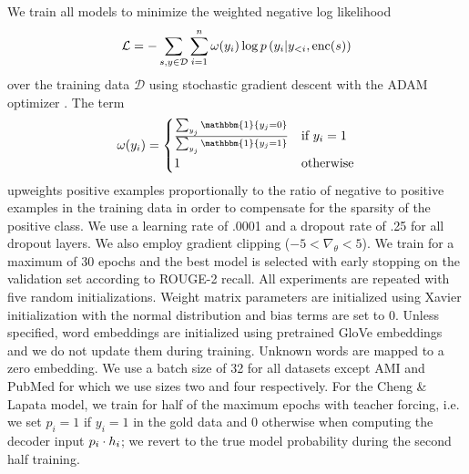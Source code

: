 We train all models to minimize the weighted negative log likelihood
\[\mathcal{L} = -\sum_{s,y\in \mathcal{D}} \sum_{i=1}^\docSize \omega(y_i) \log p\left(y_i|y_{<i},
\operatorname{enc}(\sent)\right)\]
over the training data $\mathcal{D}$
using stochastic gradient descent with the ADAM optimizer
\cite{kingma2014adam}. The term 
\[ \omega(y_i)=\begin{cases}
\frac{\sum_{y_j} \mathbbm{1}\{y_j = 0 \}}{ \sum_{y_j} \mathbbm{1}\{y_j = 1 \}  } & \textrm{if $y_i=1$} \\ 1 & \textrm{otherwise}  \end{cases} \] 
        upweights
    positive examples proportionally to the ratio of negative to positive
    examples in the training data in order to compensate for the sparsity
    of the positive class.
    We use a learning rate of .0001 and a dropout rate of .25 for all dropout
    layers. We also employ gradient clipping ($-5 < \nabla_\theta < 5$). 
    We train for a maximum of 30 epochs and the best
    model is selected with early stopping on the validation set according
    to ROUGE-2 recall. All experiments are repeated with five random
    initializations. Weight matrix parameters are initialized using 
    Xavier initialization with the normal distribution 
    \cite{glorot2010understanding} and bias terms are set to 0.
    Unless specified, word embeddings are initialized 
    using pretrained GloVe embeddings \cite{pennington2014glove} and we do 
    not update them during training. Unknown words are mapped to a zero 
    embedding.
    We use a batch size of 32 for all datasets except AMI and PubMed for
    which we use sizes two and four respectively. 
    For the Cheng \& Lapata model, we train for half of the maximum epochs 
    with teacher forcing, i.e. we set $p_i = 1$
    if $y_i = 1$ in the gold data and 0 otherwise 
    when computing the decoder input 
    $p_i \cdot \sentEmb[i]$; we revert to the true model probability 
    during the second half training.

